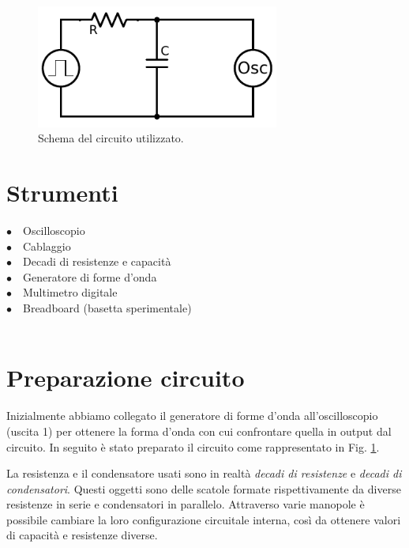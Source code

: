\begin{figure}
	\centering
    \includegraphics[width=80mm]{schema.pdf}
    \caption{Schema del circuito utilizzato.}
    \label{fig:circuito}
\end{figure}


\section{Strumenti}

$\bullet \quad$Oscilloscopio \\
$\bullet \quad$Cablaggio\\
$\bullet \quad$Decadi di resistenze e capacità\\
$\bullet \quad$Generatore di forme d'onda\\
$\bullet \quad$Multimetro digitale\\
$\bullet \quad$Breadboard (basetta sperimentale)\\

\hspace{2pt}\\

\section{Preparazione circuito}

Inizialmente abbiamo collegato il generatore di forme d'onda all'oscilloscopio (uscita 1) per ottenere la forma d'onda con cui confrontare quella in output dal circuito.
In seguito è stato preparato il circuito come rappresentato in Fig. \ref{fig:circuito}.

La resistenza e il condensatore usati sono in realtà \textit{decadi di resistenze} e \textit{decadi di condensatori}. Questi oggetti sono delle scatole formate rispettivamente da diverse resistenze in serie e condensatori in parallelo. Attraverso varie manopole è possibile cambiare la loro configurazione circuitale interna, così da ottenere valori di capacità e resistenze diverse. 

